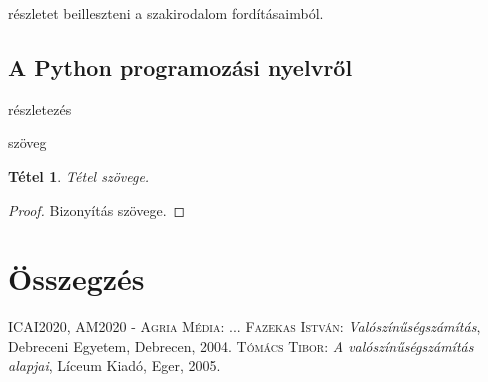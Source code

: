 \documentclass[
]{thesis-ekf}
\newtheorem{tetel}{Tétel}[chapter]
\theoremstyle{definition}
\theoremstyle{remark}
\begin{document}
	részletet beilleszteni a szakirodalom fordításaimból.


	\section{A Python programozási nyelvről}
	részletezés
	\cite[102.~oldal]{Fazekas}
	
	szöveg
	\cite{Fazekas,Tomacs}
	
	\begin{tetel}
		Tétel szövege.
	\end{tetel}
	
	\begin{proof}
		Bizonyítás szövege.
	\end{proof}
	

	

	
	\chapter*{Összegzés}

	
	\begin{thebibliography}{2}
		\textsc{ICAI2020, AM2020 - Agria Média}: ...
		\textsc{Fazekas István}: \emph{Valószínűségszámítás}, Debreceni Egyetem, Debrecen, 2004.
		\textsc{Tómács Tibor}: \emph{A valószínűségszámítás alapjai}, Líceum Kiadó, Eger, 2005.
	\end{thebibliography}
	
	
\end{document}
